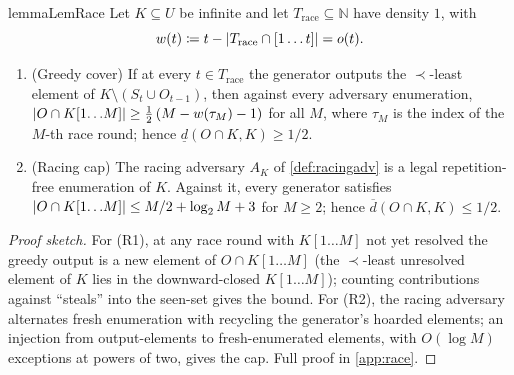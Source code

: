\documentclass[11pt]{article}
\numberwithin{equation}{section}
\newcommand{\N}{\mathbb{N}}
\newcommand{\defeq}{\coloneqq}
\DeclarePairedDelimiter{\abs}{\lvert}{\rvert}
\newcommand{\gnd}{U}
\newcommand{\Seen}{S}
\newcommand{\Out}{O}
\newcommand{\dlow}[2]{\underline{d}(#1,#2)}
\newcommand{\dup}[2]{\overline{d}(#1,#2)}
\newcommand{\rest}[2]{#1[1\!\dots\! #2]}
\theoremstyle{plain}
\theoremstyle{definition}
\theoremstyle{remark}
\begin{document}
\begin{restatable}{lemma}{LemRace}\label{lem:race}
Let $K \subseteq \gnd$ be infinite and let $T_{\mathrm{race}} \subseteq \N$ have density
$1$, with $$w(t) \defeq t - \abs{T_{\mathrm{race}} \cap [1\dots t]} = o(t).$$
\begin{enumerate}[label=\textup{(R\arabic*)}]
  \item \textup{(Greedy cover)} If at every $t \in T_{\mathrm{race}}$ the generator outputs
    the $\prec$-least element of $K \setminus (\Seen_t \cup \Out_{t-1})$, then against every
    adversary enumeration, $\abs{\Out \cap \rest{K}{M}} \ge \tfrac12\,(M - w(\tau_M) - 1)$ for
    all $M$, where $\tau_M$ is the index of the $M$-th race round; hence $\dlow{\Out \cap
    K}{K} \ge 1/2$.
  \item \textup{(Racing cap)} The racing adversary $A_K$ of \cref{def:racingadv} is a legal
    repetition-free enumeration of $K$. Against it, every generator satisfies $\abs{\Out \cap
    \rest{K}{M}} \le M/2 + \log_2 M + 3$ for $M \ge 2$; hence $\dup{\Out \cap K}{K} \le 1/2$.
\end{enumerate}
\end{restatable}

\begin{proof}[Proof sketch]
For (R1), at any race round with $\rest{K}{M}$ not yet resolved the greedy output is a new
element of $\Out \cap \rest{K}{M}$ (the $\prec$-least unresolved element of $K$ lies in the
downward-closed $\rest{K}{M}$); counting contributions against ``steals'' into the seen-set
gives the bound. For (R2), the racing adversary alternates fresh enumeration with recycling
the generator's hoarded elements; an injection from output-elements to fresh-enumerated
elements, with $O(\log M)$ exceptions at powers of two, gives the cap. Full proof in
\cref{app:race}.
\end{proof}
\end{document}
